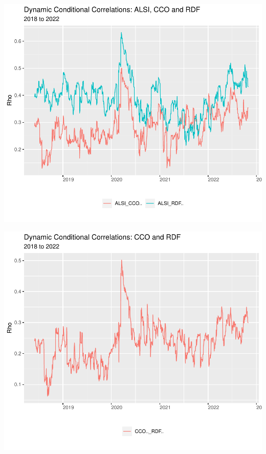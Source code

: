 \documentclass[11pt,preprint, authoryear]{elsarticle}
\let\origfigure\figure
\let\endorigfigure\endfigure
\renewenvironment{figure}[1][2] {
    \expandafter\origfigure\expandafter[H]
} {
    \endorigfigure
}
\numberwithin{equation}{section}
\numberwithin{figure}{section}
\numberwithin{table}{section}
\begin{document}
\begin{figure}
\centering
\includegraphics{Fin_Metrics_Project_files/figure-latex/unnamed-chunk-16-1.pdf}
\caption{Dynamic Conditional Correlations Graph}
\end{figure}

\begin{figure}
\centering
\includegraphics{Fin_Metrics_Project_files/figure-latex/unnamed-chunk-17-1.pdf}
\caption{Dynamic Conditional Correlations Graph}
\end{figure}
\end{document}
